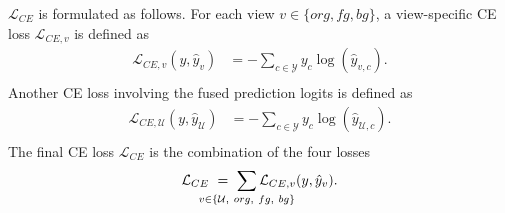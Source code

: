$\mathcal{L}_{CE}$ is formulated as follows. For each view $v \in \{org, fg, bg\}$, a view-specific CE loss $\mathcal{L}_{CE,v}$ is defined as
\begin{equation}
\begin{aligned}
    \mathcal{L}_{CE,v}(y, \hat{y}_v) & = -\sum_{c \in \mathcal{Y}} y_{c} \log(\hat{y}_{v,c}). \\
\end{aligned}
\end{equation}
Another CE loss involving the fused prediction logits is defined as
\begin{equation}
\begin{aligned}
    \mathcal{L}_{CE,\mathcal{U}}(y, \hat{y}_{\mathcal{U}}) & = -\sum_{c \in \mathcal{Y}} y_{c} \log(\hat{y}_{\mathcal{U},c}). \\
\end{aligned}
\end{equation}
The final CE loss $\mathcal{L}_{CE}$ is the combination of the four losses
\begin{equation}
\begin{aligned}
    \mathcal{L}_{CE} ~= ~\smashoperator{\sum_{v \in \{\mathcal{U}, ~org, ~fg, ~bg\}}} \mathcal{L}_{CE,v} (y, \hat{y}_{v}).
\end{aligned}
\end{equation}

